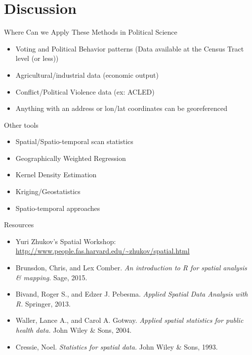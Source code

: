 \documentclass[aspectratio = 169, 12pt]{beamer}\usepackage[]{graphicx}\usepackage[]{color}
\begin{document}
\section{Discussion}
\begin{frame}{Where Can we Apply These Methods in Political Science}
\begin{itemize}
\item Voting and Political Behavior patterns (Data available at the Census Tract level (or less))
\item Agricultural/industrial data (economic output)
\item Conflict/Political Violence data (ex: ACLED)
\item Anything with an address or lon/lat coordinates can be georeferenced
\end{itemize}
\end{frame}

\begin{frame}{Other tools}
\begin{itemize}
\item Spatial/Spatio-temporal scan statistics
\item Geographically Weighted Regression
\item Kernel Density Estimation
\item Kriging/Geostatistics
\item Spatio-temporal approaches
\end{itemize}
\end{frame}

\begin{frame}{Resources}
\begin{itemize}
\item Yuri Zhukov's Spatial Workshop: \url{http://www.people.fas.harvard.edu/~zhukov/spatial.html}
\item Brunsdon, Chris, and Lex Comber. \textit{An introduction to R for spatial analysis \& mapping.} Sage, 2015.
\item Bivand, Roger S., and Edzer J. Pebesma. \textit{Applied Spatial Data Analysis with R.} Springer, 2013.
\item Waller, Lance A., and Carol A. Gotway. \textit{Applied spatial statistics for public health data.} John Wiley \& Sons, 2004.
\item Cressie, Noel. \textit{Statistics for spatial data.} John Wiley \& Sons, 1993.
\end{itemize}
\end{frame}
\end{document}
